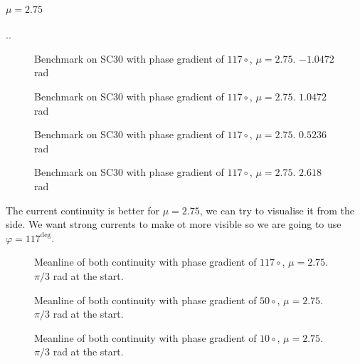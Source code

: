 \documentclass[../main.tex]{subfiles}
\begin{document}
\paragraph{$\mu = 2.75$}..
\begin{figure}[H]
    \centering
    
    \caption{Benchmark on SC30 with phase gradient of $117 \circ$, $\mu = 2.75$. $-1.0472$ rad}
    \label{fig:sc30_fixed_flat_phase}
\end{figure}
\begin{figure}[H]
    \centering
    
    \caption{Benchmark on SC30 with phase gradient of $117 \circ$, $\mu = 2.75$. $1.0472$ rad}
    \label{fig:sc30_fixed_flat_phase}

\end{figure}
\begin{figure}[H]
    \centering
    
    \caption{Benchmark on SC30 with phase gradient of $117 \circ$, $\mu = 2.75$. $0.5236$ rad}
    \label{fig:sc30_fixed_flat_phase}
\end{figure}
\begin{figure}[H]
    \centering
    
    \caption{Benchmark on SC30 with phase gradient of $117 \circ$, $\mu = 2.75$. $2.618$ rad}
    \label{fig:sc30_fixed_flat_phase}
\end{figure}
The current continuity is better for $\mu = 2.75$, we can try to visualise it from the side. We want strong currents to make 
ot more visible so we are going to use $\varphi = 117^{\deg}$.
\begin{figure}[H]
    \centering
    
    \caption{Meanline of both continuity with phase gradient of $117 \circ$, $\mu = 2.75$. $\pi/3$ rad at the start.}
    \label{fig:sc30_fixed_flat_phase}
\end{figure}
\begin{figure}[H]
    \centering
    
    \caption{Meanline of both continuity with phase gradient of $50 \circ$, $\mu = 2.75$. $\pi/3$ rad at the start.}
    \label{fig:sc30_fixed_flat_phase}
\end{figure}\begin{figure}[H]
    \centering
    
    \caption{Meanline of both continuity with phase gradient of $10 \circ$, $\mu = 2.75$. $\pi/3$ rad at the start.}
    \label{fig:sc30_fixed_flat_phase}
\end{figure}
\end{document}
